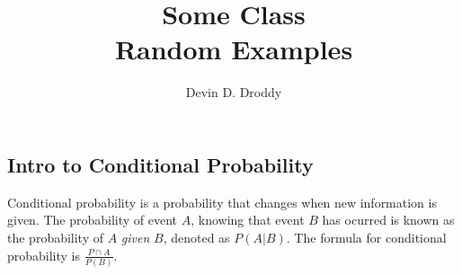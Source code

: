 \documentclass{report}
\title{\Huge{Some Class}\\Random Examples}
\author{\huge{Devin D. Droddy}}
\date{}
\begin{document}
\maketitle
\newpage%
\tableofcontents
\pagebreak

\chapter{}

\section{Intro to Conditional Probability}

Conditional probability is a probability that changes when new information is given. The probability of event $A$, knowing that event $B$ has ocurred is known as the probability of $A$ \textit{given} $B$, denoted as $P(A|B)$. The formula for conditional probability is $\frac{P \cap A}{P(B)}$.
\end{document}

